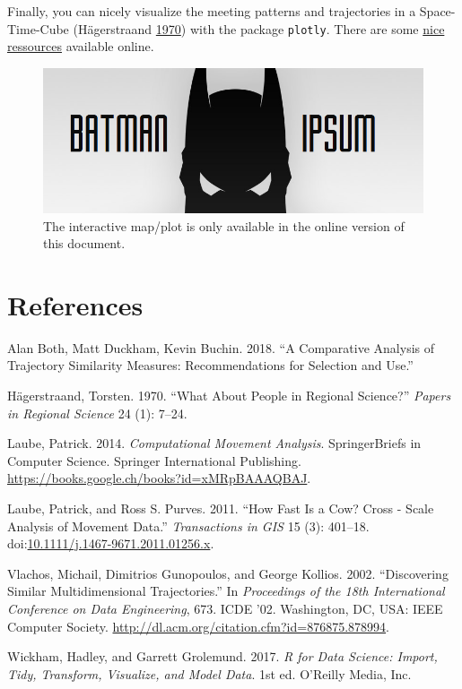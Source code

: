 \documentclass[]{book}
\begin{document}
Finally, you can nicely visualize the meeting patterns and trajectories
in a Space-Time-Cube (Hägerstraand
\protect\hyperlink{ref-hagerstraand1970}{1970}) with the package
\texttt{plotly}. There are some
\href{https://plot.ly/r/3d-line-plots/}{nice ressources} available
online.

\begin{figure}
\centering
\includegraphics{02_Images/batman-ipsum.png}
\caption{The interactive map/plot is only available in the online
version of this document.}
\end{figure}

\chapter*{References}\label{references}

\hypertarget{refs}{}
\hypertarget{ref-both2018}{}
Alan Both, Matt Duckham, Kevin Buchin. 2018. ``A Comparative Analysis of
Trajectory Similarity Measures: Recommendations for Selection and Use.''

\hypertarget{ref-hagerstraand1970}{}
Hägerstraand, Torsten. 1970. ``What About People in Regional Science?''
\emph{Papers in Regional Science} 24 (1): 7--24.

\hypertarget{ref-laube2014}{}
Laube, Patrick. 2014. \emph{Computational Movement Analysis}.
SpringerBriefs in Computer Science. Springer International Publishing.
\url{https://books.google.ch/books?id=xMRpBAAAQBAJ}.

\hypertarget{ref-laube2011}{}
Laube, Patrick, and Ross S. Purves. 2011. ``How Fast Is a Cow? Cross -
Scale Analysis of Movement Data.'' \emph{Transactions in GIS} 15 (3):
401--18.
doi:\href{https://doi.org/10.1111/j.1467-9671.2011.01256.x}{10.1111/j.1467-9671.2011.01256.x}.

\hypertarget{ref-vlachos2002}{}
Vlachos, Michail, Dimitrios Gunopoulos, and George Kollios. 2002.
``Discovering Similar Multidimensional Trajectories.'' In
\emph{Proceedings of the 18th International Conference on Data
Engineering}, 673. ICDE '02. Washington, DC, USA: IEEE Computer Society.
\url{http://dl.acm.org/citation.cfm?id=876875.878994}.

\hypertarget{ref-wickham2017}{}
Wickham, Hadley, and Garrett Grolemund. 2017. \emph{R for Data Science:
Import, Tidy, Transform, Visualize, and Model Data}. 1st ed. O'Reilly
Media, Inc.
\end{document}
